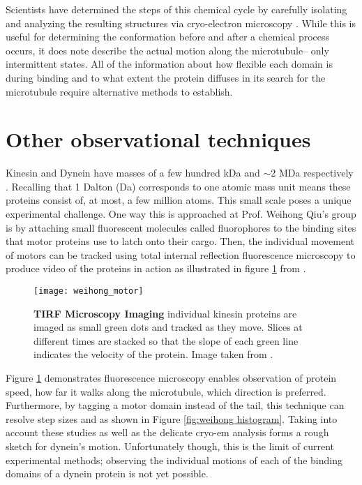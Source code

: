 Scientists have determined the steps of this chemical cycle by carefully isolating and analyzing the resulting structures via cryo-electron microscopy \cite{cryo_em}. While this is useful for determining the conformation before and after a chemical process occurs, it does note describe the actual motion along the microtubule-- only intermittent states. All of the information about how flexible each domain is during binding and to what extent the protein diffuses in its search for the microtubule require alternative methods to establish.

\section{Other observational techniques} 
 Kinesin and Dynein have masses of a few hundred kDa and  $\sim2$ MDa respectively \cite{liao_kinesin_1998, johnson_structure_1983}. Recalling that 1 Dalton (Da) corresponds to one atomic mass unit means these proteins consist of, at most, a few million atoms. This small scale poses a unique experimental challenge. One way this is approached at Prof. Weihong Qiu's group is by attaching small fluorescent molecules called fluorophores to the binding sites that motor proteins use to latch onto their cargo. Then, the individual movement of motors can be tracked using total internal reflection fluorescence microscopy to produce video of the proteins in action as illustrated in figure \ref{fig:weihong tirf} from \cite{qiu_dynein_2012}. 

\begin{figure}[!hbt]
	\centering
	\texttt{[image: weihong\_motor]}
	\caption{\textbf{TIRF Microscopy Imaging} individual kinesin proteins are imaged as small green dots and tracked as they move. Slices at different times are stacked so that the slope of each green line indicates the velocity of the protein. Image taken from \cite{qiu_dynein_2012}.}
	\label{fig:weihong tirf}
\end{figure}

Figure \ref{fig:weihong tirf} demonstrates fluorescence microscopy enables observation of protein speed, how far it walks along the microtubule, which direction is preferred. Furthermore, by tagging a motor domain instead of the tail, this technique can resolve step sizes and as shown in Figure \ref{fig:weihong histogram}. \cite{qiu_dynein_2012} Taking into account these studies as well as the delicate cryo-em analysis forms a rough sketch for dynein's motion. Unfortunately though, this is the limit of current experimental methods; observing the individual motions of each of the binding domains of a dynein protein is not yet possible. 


